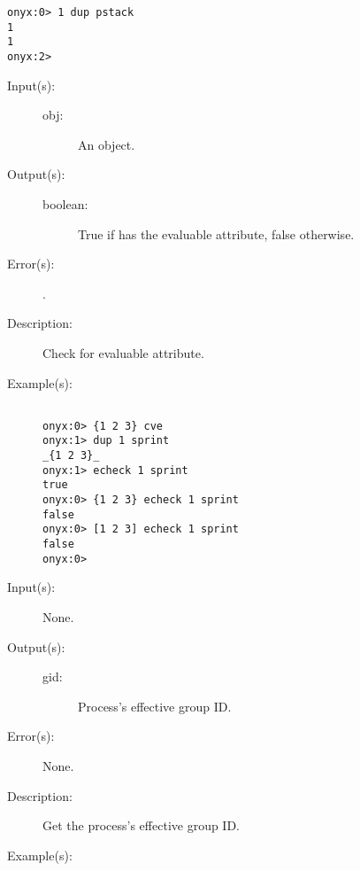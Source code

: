 \begin{description}
\begin{description}
\begin{verbatim}
onyx:0> 1 dup pstack
1
1
onyx:2>
		\end{verbatim}
	\end{description}
\label{systemdict:echeck}
\item[{\onyxop{obj}{echeck}{boolean}}: ]
	\begin{description}\item[]
	\item[Input(s): ]
		\begin{description}\item[]
		\item[obj: ]
			An object.
		\end{description}
	\item[Output(s): ]
		\begin{description}\item[]
		\item[boolean: ]
			True if  has the evaluable attribute,
			false otherwise.
		\end{description}
	\item[Error(s): ]
		\begin{description}\item[]
		\item[.]
		\end{description}
	\item[Description: ]
		Check  for evaluable attribute.
	\item[Example(s): ]\begin{verbatim}

onyx:0> {1 2 3} cve
onyx:1> dup 1 sprint
_{1 2 3}_
onyx:1> echeck 1 sprint
true
onyx:0> {1 2 3} echeck 1 sprint
false
onyx:0> [1 2 3] echeck 1 sprint
false
onyx:0>
		\end{verbatim}
	\end{description}
\label{systemdict:egid}
\item[{\onyxop{--}{egid}{gid}}: ]
	\begin{description}\item[]
	\item[Input(s): ] None.
	\item[Output(s): ]
		\begin{description}\item[]
		\item[gid: ]
			Process's effective group ID.
		\end{description}
	\item[Error(s): ] None.
	\item[Description: ]
		Get the process's effective group ID.
	\item[Example(s): ]\begin{verbatim}


\end{verbatim}
\end{description}
\end{description}
